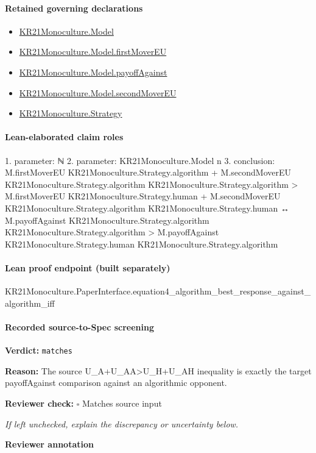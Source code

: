 \documentclass[10pt]{article}
\newcommand{\reviewerbox}{%
  \par\noindent\fbox{\parbox{0.96\linewidth}{\rule{0pt}{0.38in}}}\par
}
\newcommand{\reviewmatch}[1]{%
  \par\noindent\textbf{Reviewer check:} $\square$\; #1\par
  \noindent\emph{If left unchecked, explain the discrepancy or uncertainty below.}\par
}
\begin{document}
\paragraph{Retained governing declarations}
\begin{itemize}\raggedright
\item \hyperlink{paper-prerequisite-44d0acfebf827846}{KR21\allowbreak{}Monoculture.\allowbreak{}Model}
\item \hyperlink{governing-declaration-c7e343ac9b4d37a5}{KR21\allowbreak{}Monoculture.\allowbreak{}Model.\allowbreak{}first\allowbreak{}Mover\allowbreak{}EU}
\item \hyperlink{governing-declaration-d917035875b2df44}{KR21\allowbreak{}Monoculture.\allowbreak{}Model.\allowbreak{}payoff\allowbreak{}Against}
\item \hyperlink{governing-declaration-e4f79c4b5e166782}{KR21\allowbreak{}Monoculture.\allowbreak{}Model.\allowbreak{}second\allowbreak{}Mover\allowbreak{}EU}
\item \hyperlink{paper-prerequisite-b00425a844bd2ddf}{KR21\allowbreak{}Monoculture.\allowbreak{}Strategy}
\end{itemize}
\paragraph{Lean-elaborated claim roles}\begin{ReviewVerbatim}
1. parameter: ℕ
2. parameter: KR21Monoculture.Model n
3. conclusion: M.firstMoverEU KR21Monoculture.Strategy.algorithm +
      M.secondMoverEU KR21Monoculture.Strategy.algorithm KR21Monoculture.Strategy.algorithm >
    M.firstMoverEU KR21Monoculture.Strategy.human +
      M.secondMoverEU KR21Monoculture.Strategy.algorithm KR21Monoculture.Strategy.human ↔
  M.payoffAgainst KR21Monoculture.Strategy.algorithm KR21Monoculture.Strategy.algorithm >
    M.payoffAgainst KR21Monoculture.Strategy.human KR21Monoculture.Strategy.algorithm
\end{ReviewVerbatim}

\paragraph{Lean proof endpoint (built separately)}\begin{ReviewVerbatim}
KR21Monoculture.PaperInterface.equation4_algorithm_best_response_against_algorithm_iff
\end{ReviewVerbatim}

\paragraph{Recorded source-to-Spec screening}
\textbf{Verdict:} \texttt{matches}
\\
{\raggedright
\textbf{Reason:} The source U\_\allowbreak{}A+U\_\allowbreak{}AA>U\_\allowbreak{}H+U\_\allowbreak{}AH inequality is exactly the target payoffAgainst comparison against an algorithmic opponent.\allowbreak{}
\par}
\reviewmatch{Matches source input}
\noindent\textbf{Reviewer annotation}\par
\reviewerbox
\clearpage
\hypertarget{source-claim-9d6309ccb42ce9df}{}
\end{document}

